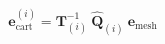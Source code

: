 \begin{equation}
\label{eq:tangentProjection}
\mathbf{e}_\text{cart}^{(i)} = \mathbf{T}_{(i)}^{-1}~\mathbf{\hat{Q}}_{(i)} ~ \mathbf{e}_{\text{mesh}}
\end{equation}
